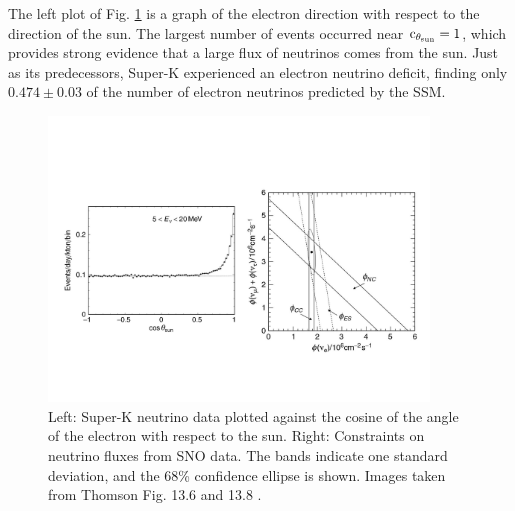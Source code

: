 The left plot of Fig. \ref{fig:superKdata} is a graph of the electron 
direction with respect to the
direction of the sun. The largest number of events occurred near 
$\operatorname{c}_{\theta_{\rm sun}}=1$,
which provides strong evidence that a large flux of neutrinos comes from the
sun. Just as its predecessors, Super-K experienced an electron neutrino
deficit, finding only $0.474\pm0.03$ of the number of electron neutrinos
predicted by the SSM.

\begin{figure}
  \centering
  \vspace{-20mm}
  \includegraphics[width=0.9\textwidth,keepaspectratio]
                {pictures/t13_6&8.pdf}
  \vspace*{-20mm}
  \caption{Left: Super-K neutrino data plotted against the cosine of the
           angle of the electron with respect to the sun. Right: Constraints
           on neutrino fluxes from SNO data. The bands indicate one standard
           deviation, and the 68\% confidence ellipse is shown. Images taken
           from Thomson Fig. 13.6 and 13.8 \cite{thomson_modern_2013}.}
  \label{fig:superKdata}
\end{figure}

